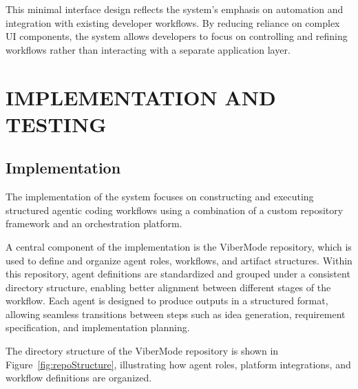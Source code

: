 \documentclass[a4paper,12pt]{report}
\begin{document}
This minimal interface design reflects the system's emphasis on automation and integration with existing developer workflows. By reducing reliance on complex UI components, the system allows developers to focus on controlling and refining workflows rather than interacting with a separate application layer.

\chapter{IMPLEMENTATION AND TESTING}
\section{Implementation}
The implementation of the system focuses on constructing and executing structured agentic coding workflows using a combination of a custom repository framework and an orchestration platform.

A central component of the implementation is the ViberMode repository, which is used to define and organize agent roles, workflows, and artifact structures. Within this repository, agent definitions are standardized and grouped under a consistent directory structure, enabling better alignment between different stages of the workflow. Each agent is designed to produce outputs in a structured format, allowing seamless transitions between steps such as idea generation, requirement specification, and implementation planning.

The directory structure of the ViberMode repository is shown in Figure~\ref{fig:repoStructure}, illustrating how agent roles, platform integrations, and workflow definitions are organized.
\end{document}
